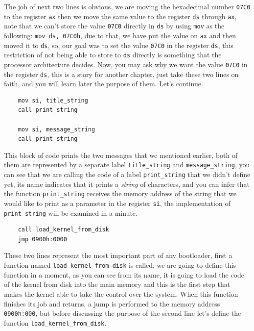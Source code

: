The job of next two lines is obvious, we are moving the hexadecimal
number \lstinline!07C0! to the register \lstinline!ax! then we move the
same value to the register \lstinline!ds! through \lstinline!ax!, note
that we can't store the value \lstinline!07C0! directly in
\lstinline!ds! by using \lstinline!mov! as the following:
\lstinline!mov ds, 07C0h!, due to that, we have put the value on
\lstinline!ax! and then moved it to \lstinline!ds!, so, our goal was to
set the value \lstinline!07C0! in the register \lstinline!ds!, this
restriction of not being able to store to \lstinline!ds! directly is
something that the processor architecture decides. Now, you may ask why
we want the value \lstinline!07C0! in the register \lstinline!ds!, this
is a story for another chapter, just take these two lines on faith, and
you will learn later the purpose of them. Let's continue.

\begin{lstlisting}
    mov si, title_string
    call print_string
    
    mov si, message_string
    call print_string
\end{lstlisting}

This block of code prints the two messages that we mentioned earlier,
both of them are represented by a separate label
\lstinline!title_string! and \lstinline!message_string!, you can see
that we are calling the code of a label \lstinline!print_string! that we
didn't define yet, its name indicates that it prints a \emph{string} of
characters, and you can infer that the function \lstinline!print_string!
receives the memory address of the string that we would like to print as
a parameter in the register \lstinline!si!, the implementation of
\lstinline!print_string! will be examined in a minute.

\begin{lstlisting}
    call load_kernel_from_disk
    jmp 0900h:0000
\end{lstlisting}

These two lines represent the most important part of any bootloader,
first a function named \lstinline!load_kernel_from_disk! is called, we
are going to define this function in a moment, as you can see from its
name, it is going to load the code of the kernel from disk into the main
memory and this is the first step that makes the kernel able to take the
control over the system. When this function finishes its job and
returns, a jump is performed to the memory address
\lstinline!0900h:000!, but before discussing the purpose of the second
line let's define the function \lstinline!load_kernel_from_disk!.

